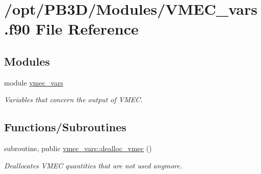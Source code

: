 \hypertarget{VMEC__vars_8f90}{}\section{/opt/\+P\+B3\+D/\+Modules/\+V\+M\+E\+C\+\_\+vars.f90 File Reference}
\label{VMEC__vars_8f90}
\subsection*{Modules}
\begin{DoxyCompactItemize}
\item 
module \hyperlink{namespacevmec__vars}{vmec\+\_\+vars}
\begin{DoxyCompactList}\small\item\em Variables that concern the output of V\+M\+EC. \end{DoxyCompactList}\end{DoxyCompactItemize}
\subsection*{Functions/\+Subroutines}
\begin{DoxyCompactItemize}
\item 
subroutine, public \hyperlink{namespacevmec__vars_afe14ec328664d93b93c6dbda69df9175}{vmec\+\_\+vars\+::dealloc\+\_\+vmec} ()
\begin{DoxyCompactList}\small\item\em Deallocates V\+M\+EC quantities that are not used anymore. \end{DoxyCompactList}\end{DoxyCompactItemize}
